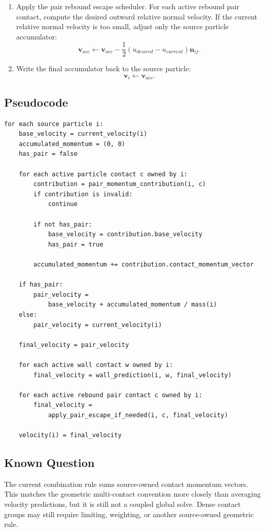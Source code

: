 \begin{enumerate}
    \item Apply the pair rebound escape scheduler. For each active rebound pair
    contact, compute the desired outward relative normal velocity. If the
    current relative normal velocity is too small, adjust only the source
    particle accumulator:
    \[
        \mathbf{v}_{acc}
        \leftarrow
        \mathbf{v}_{acc}
        -
        \frac{1}{2}
        \left(
            u_{desired}
            -
            u_{current}
        \right)
        \mathbf{n}_{ij}.
    \]

    \item Write the final accumulator back to the source particle:
    \[
        \mathbf{v}_i \leftarrow \mathbf{v}_{acc}.
    \]
\end{enumerate}

\subsection{Pseudocode}

\begin{verbatim}
for each source particle i:
    base_velocity = current_velocity(i)
    accumulated_momentum = (0, 0)
    has_pair = false

    for each active particle contact c owned by i:
        contribution = pair_momentum_contribution(i, c)
        if contribution is invalid:
            continue

        if not has_pair:
            base_velocity = contribution.base_velocity
            has_pair = true

        accumulated_momentum += contribution.contact_momentum_vector

    if has_pair:
        pair_velocity =
            base_velocity + accumulated_momentum / mass(i)
    else:
        pair_velocity = current_velocity(i)

    final_velocity = pair_velocity

    for each active wall contact w owned by i:
        final_velocity = wall_prediction(i, w, final_velocity)

    for each active rebound pair contact c owned by i:
        final_velocity =
            apply_pair_escape_if_needed(i, c, final_velocity)

    velocity(i) = final_velocity
\end{verbatim}

\subsection{Known Question}

The current combination rule sums source-owned contact momentum vectors.  This
matches the geometric multi-contact convention more closely than averaging
velocity predictions, but it is still not a coupled global solve.  Dense contact
groups may still require limiting, weighting, or another source-owned
geometric rule.
